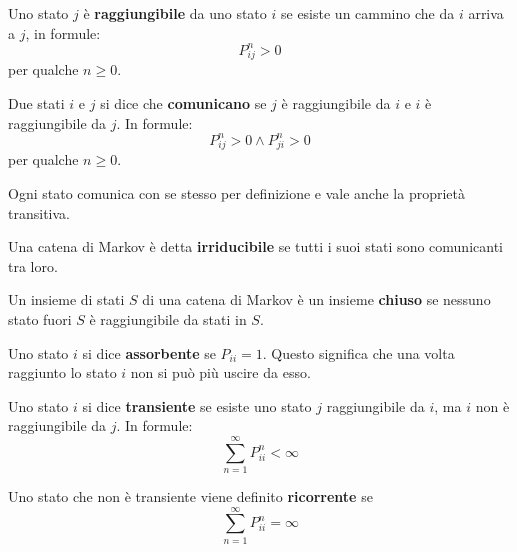 \begin{definizione}
    Uno stato $j$ è \textbf{raggiungibile} da uno stato $i$ se esiste un cammino
    che da $i$ arriva a $j$, in formule:
    \begin{equation*}
        P^n_{ij}>0
    \end{equation*}
    per qualche $n\geq 0$.
\end{definizione}
\begin{definizione}
    Due stati $i$ e $j$ si dice che \textbf{comunicano} se $j$ è raggiungibile
    da $i$ e $i$ è raggiungibile da $j$. In formule:
    \begin{equation*}
        P^n_{ij}>0 \land P^n_{ji}>0
    \end{equation*}
    per qualche $n\geq 0$.
\end{definizione}
\begin{nota}
    Ogni stato comunica con se stesso per definizione e vale anche la proprietà
    transitiva.
\end{nota}
\begin{definizione}
    Una catena di Markov è detta \textbf{irriducibile} se tutti i suoi stati sono
    comunicanti tra loro.
\end{definizione}
\begin{definizione}
    Un insieme di stati $S$ di una catena di Markov è un insieme \textbf{chiuso}
    se nessuno stato fuori $S$ è raggiungibile da stati in $S$.
\end{definizione}
\begin{definizione}
    Uno stato $i$ si dice \textbf{assorbente} se $P_{ii} = 1$. Questo significa
    che una volta raggiunto lo stato $i$ non si può più uscire da esso.
\end{definizione}
\begin{definizione}
    Uno stato $i$ si dice \textbf{transiente} se esiste uno stato $j$ raggiungibile
    da $i$, ma $i$ non è raggiungibile da $j$. In formule:
    \begin{equation*}
        \sum_{n=1}^{\infty} P_{ii}^n < \infty
    \end{equation*}
\end{definizione}
\begin{definizione}
    Uno stato che non è transiente viene definito \textbf{ricorrente} se
    \begin{equation*}
        \sum_{n=1}^{\infty} P_{ii}^n = \infty
    \end{equation*}
\end{definizione}
